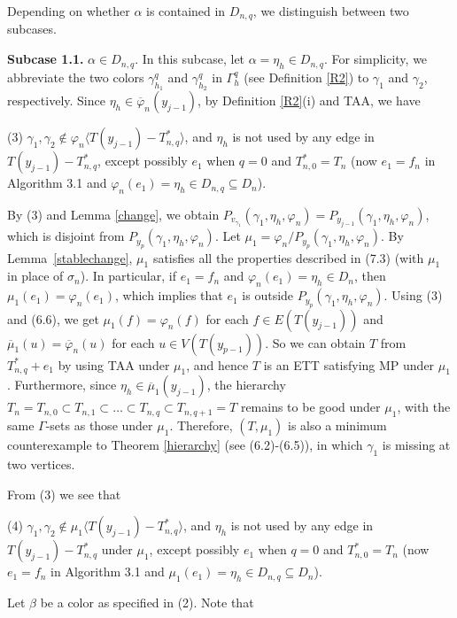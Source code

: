 \documentclass[11pt]{article}
\begin{document}
Depending on whether $\alpha$ is contained in $D_{n,q}$, we distinguish between two subcases.

{\bf Subcase 1.1.} $\alpha \in D_{n,q}$. In this subcase, let $\alpha=\eta_{h}\in D_{n,q}$. For simplicity, we abbreviate the two colors $\gamma^{q}_{h_1}$ and $\gamma^{q}_{h_2}$ in $\Gamma^{q}_h$ (see Definition \ref{R2}) to $\gamma_1$ and $\gamma_2$, 
respectively. Since $\eta_{h} \in\overline{\varphi}_n(y_{j-1})$, by Definition \ref{R2}(i) and TAA, we have

(3) $\gamma_1, \gamma_2 \notin \varphi_n \langle T(y_{j-1}) - T_{n,q}^* \rangle$, and $\eta_h$ is not used by 
any edge in $T(y_{j-1}) -  T_{n,q}^*$, except possibly $e_1$ when $q=0$ and $T_{n,0}^*=T_n$ (now $e_1=f_n$ in 
Algorithm 3.1 and $\varphi_n(e_1)=\eta_h \in  D_{n,q} \subseteq  D_n$). 

By (3) and Lemma \ref{change}, we obtain $P_{v_{\gamma_1}}(\gamma_1,\eta_h,\varphi_n)=P_{y_{j-1}}(\gamma_1,\eta_h,
\varphi_n)$, which is disjoint from $P_{y_{p}}(\gamma_1,\eta_h,\varphi_n)$. Let $\mu_1=\varphi_n/P_{y_{p}}(\gamma_1,
\eta_h,\varphi_n)$. By Lemma~\ref{stablechange},  $\mu_1$ satisfies all the properties described in (7.3) (with $\mu_1$ 
in place of $\sigma_n$). In particular, if $e_1=f_n$ and $\varphi_n(e_1)=\eta_h \in D_n$, then $\mu_1(e_1)=\varphi_n(e_1)$, 
which implies that $e_1$ is outside $P_{y_{p}}(\gamma_1,\eta_h,\varphi_n)$. 
Using (3) and (6.6), we get $\mu_1(f)=\varphi_n(f)$ for each $f\in E(T(y_{j-1}))$ and 
$\overline{\mu}_1(u)= \overline{\varphi}_n(u)$ for each $u\in V(T(y_{p-1}))$. So we can obtain $T$ from $T_{n,q}^*+e_1$ by 
using TAA under $\mu_1$, and hence $T$ is an ETT satisfying MP under $\mu_1$. Furthermore, since $\eta_h \in \overline{\mu}_1(y_{j-1})$,
the hierarchy $T_n=T_{n,0} \subset T_{n,1} \subset \ldots \subset T_{n,q} \subset T_{n,q+1}=T$ remains to be good 
under $\mu_1$, with the same $\Gamma$-sets as those under $\mu_1$. Therefore, $(T, \mu_1)$ is also a minimum counterexample 
to Theorem \ref{hierarchy} (see (6.2)-(6.5)), in which $\gamma_1$ is missing at two vertices.

From (3) we see that

(4) $\gamma_1, \gamma_2 \notin \mu_1 \langle T(y_{j-1}) - T_{n,q}^* \rangle$, and $\eta_h$ is not used by 
any edge in $T(y_{j-1}) -  T_{n,q}^*$ under $\mu_1$, except possibly $e_1$ when $q=0$ and $T_{n,0}^*=T_n$ 
(now $e_1=f_n$ in Algorithm 3.1 and $\mu_1(e_1)=\eta_h \in  D_{n,q} \subseteq  D_n$). 

Let $\beta$ be a color as specified in (2). Note that 
\end{document}
